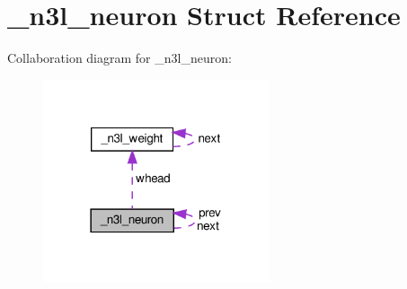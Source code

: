 \hypertarget{struct__n3l__neuron}{}\section{\+\_\+n3l\+\_\+neuron Struct Reference}
\label{struct__n3l__neuron}


Collaboration diagram for \+\_\+n3l\+\_\+neuron\+:\nopagebreak
\begin{figure}[H]
\begin{center}
\leavevmode
\includegraphics[width=189pt]{struct__n3l__neuron__coll__graph}
\end{center}
\end{figure}
